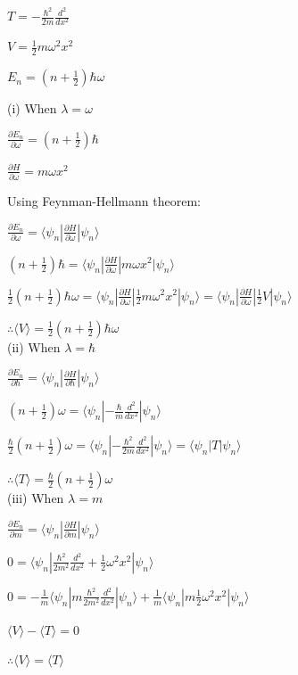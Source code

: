 \documentclass[12pt]{article}
\begin{document}
\begin{spacing}{2.0}
$T=-\frac{\hbar^2}{2m}\frac{d^2}{dx^2}$

$V=\frac{1}{2}m\omega^2x^2$

$E_n=(n+\frac{1}{2})\hbar \omega$

(i) When $\lambda = \omega$

$\frac{\partial E_n}{\partial \omega}= (n+\frac{1}{2})\hbar$

$\frac{\partial H}{\partial \omega}= m\omega x^2$

Using Feynman-Hellmann theorem:

$\frac{\partial E_n}{\partial \omega}= \langle \psi_n|\frac{\partial H}{\partial \omega}|\psi_n \rangle$

$(n+\frac{1}{2})\hbar = \langle \psi_n|\frac{\partial H}{\partial \omega}|m\omega x^2|\psi_n \rangle$

$\frac{1}{2}(n+\frac{1}{2})\hbar \omega= \langle \psi_n|\frac{\partial H}{\partial \omega}|\frac{1}{2}m\omega^2 x^2|\psi_n \rangle = \langle \psi_n|\frac{\partial H}{\partial \omega}|\frac{1}{2}V|\psi_n \rangle$

$\therefore \langle V \rangle = \frac{1}{2}(n+\frac{1}{2})\hbar \omega$\\

(ii) When $\lambda=\hbar$

$\frac{\partial E_n}{\partial \hbar}= \langle \psi_n|\frac{\partial H}{\partial \hbar}|\psi_n \rangle$

$(n+\frac{1}{2}) \omega= \langle \psi_n|-\frac{\hbar}{m}\frac{d^2}{dx^2}|\psi_n \rangle$

$\frac{\hbar}{2}(n+\frac{1}{2}) \omega= \langle \psi_n|-\frac{\hbar^2}{2m}\frac{d^2}{dx^2}|\psi_n \rangle= \langle \psi_n|T|\psi_n \rangle$

$\therefore \langle T \rangle = \frac{\hbar}{2}(n+\frac{1}{2}) \omega$\\

(iii) When $\lambda=m$

$\frac{\partial E_n}{\partial m}= \langle \psi_n|\frac{\partial H}{\partial m}|\psi_n \rangle$

$0=\langle \psi_n|\frac{\hbar^2}{2m^2}\frac{d^2}{dx^2} + \frac{1}{2} \omega^2 x^2|\psi_n \rangle$

$0=-\frac{1}{m}\langle \psi_n|m\frac{\hbar^2}{2m^2}\frac{d^2}{dx^2} |\psi_n \rangle + \frac{1}{m} \langle \psi_n| m\frac{1}{2} \omega^2 x^2|\psi_n \rangle$

$\langle V \rangle - \langle T \rangle =0 $

$\therefore \langle V \rangle= \langle T \rangle$\\


\end{spacing}
\end{document}
